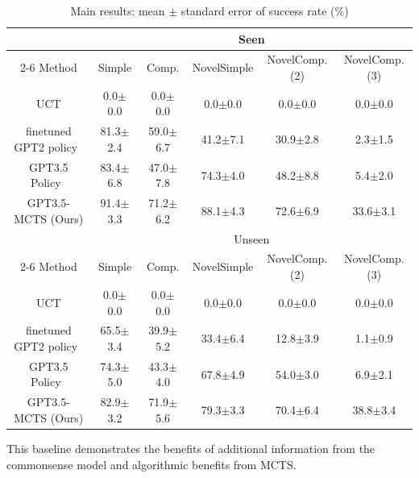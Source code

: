 \begin{table}
\vspace{-15pt}
\setlength\extrarowheight{-3pt}
\setlength\tabcolsep{2pt}
\centering\scriptsize
\caption{Main results: mean $\pm$ standard error of success rate (\%)}
\begin{tabular}{@{}cccccc@{}}
\toprule
                  & \multicolumn{5}{c}{Seen}                          \\ \cmidrule(l){2-6} 
Method            &  Simple &  Comp. & NovelSimple & NovelComp.(2) & NovelComp.(3) \\ \midrule
UCT \cite{kocsis2006bandit} &  0.0$\pm$0.0        &  0.0$\pm$0.0       &  0.0$\pm$0.0       & 0.0$\pm$0.0    & 0.0$\pm$0.0  \\
finetuned GPT2 policy~\cite{li2022pre}  &   81.3$\pm$2.4    &  59.0$\pm$6.7        &  41.2$\pm$7.1      &    30.9$\pm$2.8     &  2.3$\pm$1.5           \\
GPT3.5 Policy~\cite{huang2022language} &   83.4$\pm$6.8  &  47.0$\pm$7.8      &    74.3$\pm$4.0      &     48.2$\pm$8.8      &    5.4$\pm$2.0     \\
GPT3.5-MCTS (Ours)      & 91.4$\pm$3.3   &  71.2$\pm$6.2    &  88.1$\pm$4.3   &  72.6$\pm$6.9       &      33.6$\pm$3.1        \\ \toprule
                  & \multicolumn{5}{c}{Unseen}                   \\ \cmidrule(l){2-6} 
Method            &  Simple &  Comp.  & NovelSimple & NovelComp.(2) & NovelComp.(3) \\ \midrule
UCT \cite{kocsis2006bandit} &   0.0$\pm$0.0      &  0.0$\pm$0.0        &  0.0$\pm$0.0         &    0.0$\pm$0.0           &    0.0$\pm$0.0   \\
finetuned GPT2 policy~\cite{li2022pre} &    65.5$\pm$3.4     &  39.9$\pm$5.2      &  33.4$\pm$6.4         &  12.8$\pm$3.9           &    1.1$\pm$0.9    \\
GPT3.5 Policy~\cite{huang2022language} &   74.3$\pm$5.0     &  43.3$\pm$4.0       &  67.8$\pm$4.9        &     54.0$\pm$3.0       &   6.9$\pm$2.1  \\
GPT3.5-MCTS (Ours)    &  82.9$\pm$3.2   &  71.9$\pm$5.6    &  79.3$\pm$3.3   &   70.4$\pm$6.4      &   38.8$\pm$3.4  \\ \bottomrule
\end{tabular}
\label{tab:main}
\end{table}
This baseline demonstrates the benefits of additional information from the commonsense model and algorithmic benefits from MCTS. 


